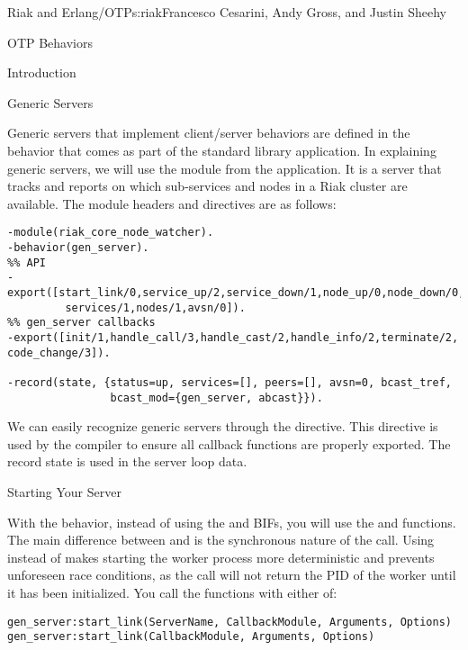 \begin{aosachapter}{Riak and Erlang/OTP}{s:riak}{Francesco Cesarini, Andy Gross, and Justin Sheehy}
\begin{aosasect1}{OTP Behaviors}
\begin{aosasect2}{Introduction}
\end{aosasect2}

\begin{aosasect2}{Generic Servers}

Generic servers that implement client/server behaviors are defined in
the  behavior that comes as part of the standard
library application. In explaining generic servers, we will use the
 module from the 
application. It is a server that tracks and reports on which
sub-services and nodes in a Riak cluster are available. The module
headers and directives are as follows:

\begin{verbatim}
-module(riak_core_node_watcher).
-behavior(gen_server).
%% API
-export([start_link/0,service_up/2,service_down/1,node_up/0,node_down/0,services/0,
         services/1,nodes/1,avsn/0]).
%% gen_server callbacks
-export([init/1,handle_call/3,handle_cast/2,handle_info/2,terminate/2, code_change/3]).

-record(state, {status=up, services=[], peers=[], avsn=0, bcast_tref,
                bcast_mod={gen_server, abcast}}).
\end{verbatim}

We can easily recognize generic servers through the
 directive. This directive is used by
the compiler to ensure all callback functions are properly
exported. The record state is used in the server loop data.

\end{aosasect2}

\begin{aosasect2}{Starting Your Server}

With the  behavior, instead of using the
 and  BIFs, you will use the
 and 
functions. The main difference between  and 
is the synchronous nature of the call. Using  instead of
 makes starting the worker process more deterministic and
prevents unforeseen race conditions, as the call will not return the
PID of the worker until it has been initialized. You call the
functions with either of:

\begin{verbatim}
gen_server:start_link(ServerName, CallbackModule, Arguments, Options)
gen_server:start_link(CallbackModule, Arguments, Options)
\end{verbatim}


\end{aosasect2}
\end{aosasect1}
\end{aosachapter}
